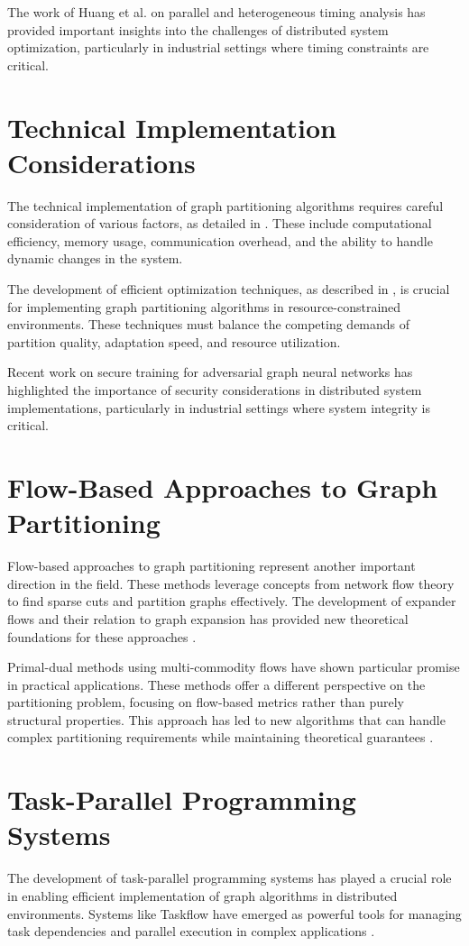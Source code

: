 The work of Huang et al. \cite{huang2024parallel} on parallel and heterogeneous timing analysis has provided important insights into the challenges of distributed system optimization, particularly in industrial settings where timing constraints are critical.

\section{Technical Implementation Considerations}
The technical implementation of graph partitioning algorithms requires careful consideration of various factors, as detailed in \cite{technical2023}. These include computational efficiency, memory usage, communication overhead, and the ability to handle dynamic changes in the system.

The development of efficient optimization techniques, as described in \cite{optimization2023}, is crucial for implementing graph partitioning algorithms in resource-constrained environments. These techniques must balance the competing demands of partition quality, adaptation speed, and resource utilization.

Recent work on secure training for adversarial graph neural networks \cite{rl2025security} has highlighted the importance of security considerations in distributed system implementations, particularly in industrial settings where system integrity is critical.

\section{Flow-Based Approaches to Graph Partitioning}
Flow-based approaches to graph partitioning represent another important direction in the field. These methods leverage concepts from network flow theory to find sparse cuts and partition graphs effectively. The development of expander flows and their relation to graph expansion has provided new theoretical foundations for these approaches \cite{spectral2023}.

Primal-dual methods using multi-commodity flows have shown particular promise in practical applications. These methods offer a different perspective on the partitioning problem, focusing on flow-based metrics rather than purely structural properties. This approach has led to new algorithms that can handle complex partitioning requirements while maintaining theoretical guarantees \cite{optimization2023b}.

\section{Task-Parallel Programming Systems}
The development of task-parallel programming systems has played a crucial role in enabling efficient implementation of graph algorithms in distributed environments. Systems like Taskflow have emerged as powerful tools for managing task dependencies and parallel execution in complex applications \cite{conference2023}.


